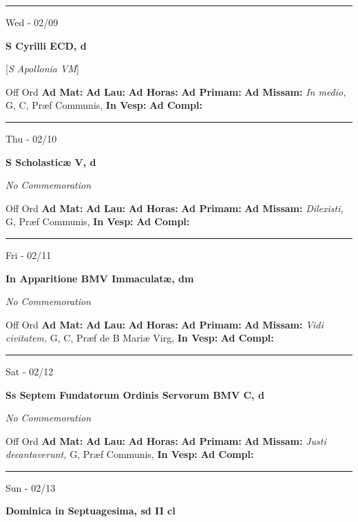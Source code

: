 \documentclass[letterpaper, 10pt]{article}
\begin{document}
\hrule
\begin{center}
Wed - 02/09
\end{center}\textbf{ \large S Cyrilli ECD, \textnormal{\normalsize d}}

[\textit{S Apollonia VM}]
\begin{justify}
Off Ord
\textbf{Ad Mat: }
\textbf{Ad Lau: }
\textbf{Ad Horas: }
\textbf{Ad Primam: }
\textbf{Ad Missam:} \textit{In medio, } G, C, Præf Communis, 
\textbf{In Vesp: }
\textbf{Ad Compl: }\end{justify}



\hrule
\begin{center}
Thu - 02/10
\end{center}\textbf{ \large S Scholasticæ V, \textnormal{\normalsize d}}

\textit{No Commemoration}\begin{justify}
Off Ord
\textbf{Ad Mat: }
\textbf{Ad Lau: }
\textbf{Ad Horas: }
\textbf{Ad Primam: }
\textbf{Ad Missam:} \textit{Dilexisti, } G, Præf Communis, 
\textbf{In Vesp: }
\textbf{Ad Compl: }\end{justify}



\hrule
\begin{center}
Fri - 02/11
\end{center}\textbf{ \large In Apparitione BMV Immaculatæ, \textnormal{\normalsize dm}}

\textit{No Commemoration}\begin{justify}
Off Ord
\textbf{Ad Mat: }
\textbf{Ad Lau: }
\textbf{Ad Horas: }
\textbf{Ad Primam: }
\textbf{Ad Missam:} \textit{Vidi civitatem, } G, C, Præf de B Mariæ Virg, 
\textbf{In Vesp: }
\textbf{Ad Compl: }\end{justify}



\hrule
\begin{center}
Sat - 02/12
\end{center}\textbf{ \large Ss Septem Fundatorum Ordinis Servorum BMV C, \textnormal{\normalsize d}}

\textit{No Commemoration}\begin{justify}
Off Ord
\textbf{Ad Mat: }
\textbf{Ad Lau: }
\textbf{Ad Horas: }
\textbf{Ad Primam: }
\textbf{Ad Missam:} \textit{Justi decantaverunt, } G, Præf Communis, 
\textbf{In Vesp: }
\textbf{Ad Compl: }\end{justify}



\hrule
\begin{center}
Sun - 02/13
\end{center}\textbf{ \large Dominica in Septuagesima, \textnormal{\normalsize sd II cl}}
\end{document}

